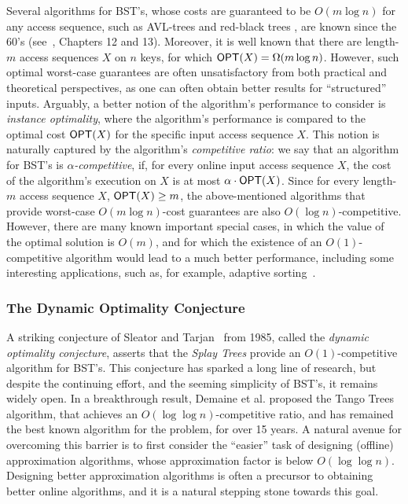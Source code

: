 \documentclass[11pt]{article}
\numberwithin{equation}{section}
\theoremstyle{definition}
\theoremstyle{plain}
\begin{document}
Several algorithms for BST's, whose costs are guaranteed to be $O(m\log n)$ for any access sequence, such as AVL-trees \cite{avl} and red-black trees \cite{Bayer1972}, are known since the 60's (see~\cite{cormen2022introduction}, Chapters 12 and 13). Moreover, it is well known that there are length-$m$ access sequences $X$ on $n$ keys, for which $\mbox{\sf OPT}(X)=\Omega(m\log n)$.
However, such optimal worst-case  guarantees are often unsatisfactory from both practical and theoretical perspectives, as one can often obtain better results for ``structured'' inputs. 
Arguably, a better notion of the algorithm's performance to consider is \emph{instance optimality}, where the algorithm's performance is compared to the optimal cost $\mbox{\sf OPT}(X)$ for the specific input access sequence $X$. This notion is naturally captured by the algorithm's \emph{competitive ratio}:  
%
we say that an algorithm for BST's is \emph{$\alpha$-competitive}, if, for every online input access sequence
$X$, the cost of the algorithm's execution on $X$ is at most $\alpha \cdot \mbox{\sf OPT}(X)$.
Since for every length-$m$ access sequence $X$, $\mbox{\sf OPT}(X)\geq m$, the above-mentioned algorithms that provide worst-case $O(m\log n)$-cost guarantees are also $O(\log n)$-competitive. 
However, there are many known important special cases, in which the value of the optimal solution is $O(m)$, and for which the existence of an $O(1)$-competitive algorithm would lead to a much better performance, including some interesting applications, such as, for example, adaptive sorting~\cite{Tar85,chaudhuri,split_Luc91,deque_Sun92,deque_Elm04,deque_Pet08,DS09,finger1,finger2,BoseDIL14,FOCS15,our_wads,IL-lazy}. 


\subsubsection{The Dynamic Optimality Conjecture} 

A striking conjecture of Sleator and Tarjan~\cite{ST85} from 1985, called the \emph{dynamic optimality conjecture}, asserts that the \emph{Splay Trees} provide an $O(1)$-competitive algorithm for BST's. 
This conjecture has sparked a long line of research, but despite the continuing effort, and the seeming simplicity of BST's, it remains widely open.
In a breakthrough result, Demaine et al. \cite{tango} proposed the Tango Trees algorithm, that achieves an $O(\log\log n)$-competitive ratio, and has remained the best known algorithm for the problem, for over 15 years.   
A natural avenue for overcoming this barrier is to first consider the ``easier'' task of designing (offline) approximation algorithms, whose approximation factor is below $O(\log \log n)$. Designing better approximation algorithms is often a precursor to obtaining better online algorithms, and it is a natural stepping stone towards this goal.  
\end{document}
